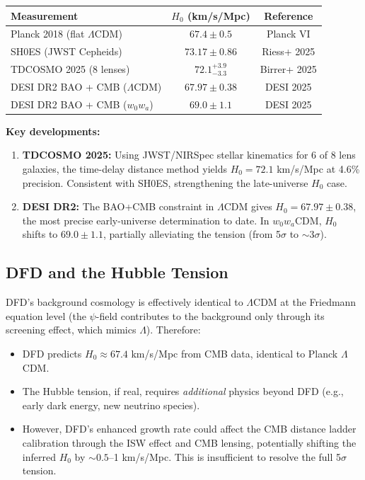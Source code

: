 \documentclass[11pt]{article}
\newcommand{\LCDM}{$\Lambda$CDM}
\newcommand{\Hzero}{H_0}
\begin{document}
\begin{center}
\begin{tabular}{lcc}
\toprule
\textbf{Measurement} & $\Hzero$ (km/s/Mpc) & \textbf{Reference} \\
\midrule
Planck 2018 (flat \LCDM) & $67.4 \pm 0.5$ & Planck VI \\
SH0ES (JWST Cepheids) & $73.17 \pm 0.86$ & Riess+ 2025 \\
TDCOSMO 2025 (8 lenses) & $72.1^{+3.9}_{-3.3}$ & Birrer+ 2025 \\
DESI DR2 BAO + CMB (\LCDM) & $67.97 \pm 0.38$ & DESI 2025 \\
DESI DR2 BAO + CMB ($w_0w_a$) & $69.0 \pm 1.1$ & DESI 2025 \\
\bottomrule
\end{tabular}
\end{center}

\textbf{Key developments:}
\begin{enumerate}
  \item \textbf{TDCOSMO 2025:} Using JWST/NIRSpec stellar kinematics
    for 6 of 8 lens galaxies, the time-delay distance method yields
    $\Hzero = 72.1$ km/s/Mpc at 4.6\% precision. Consistent with
    SH0ES, strengthening the late-universe $\Hzero$ case.
  \item \textbf{DESI DR2:} The BAO+CMB constraint in \LCDM{} gives
    $\Hzero = 67.97 \pm 0.38$, the most precise early-universe
    determination to date. In $w_0w_a$CDM, $\Hzero$ shifts to
    $69.0 \pm 1.1$, partially alleviating the tension (from 5$\sigma$
    to $\sim 3\sigma$).
\end{enumerate}

\subsection{DFD and the Hubble Tension}

DFD's background cosmology is effectively identical to \LCDM{} at the
Friedmann equation level (the $\psi$-field contributes to the background
only through its screening effect, which mimics $\Lambda$). Therefore:

\begin{itemize}
  \item DFD predicts $\Hzero \approx 67.4$ km/s/Mpc from CMB data,
    identical to Planck \LCDM.
  \item The Hubble tension, if real, requires \emph{additional} physics
    beyond DFD (e.g., early dark energy, new neutrino species).
  \item However, DFD's enhanced growth rate could affect the CMB
    distance ladder calibration through the ISW effect and CMB lensing,
    potentially shifting the inferred $\Hzero$ by $\sim 0.5$--1 km/s/Mpc.
    This is insufficient to resolve the full 5$\sigma$ tension.
\end{itemize}
\end{document}
